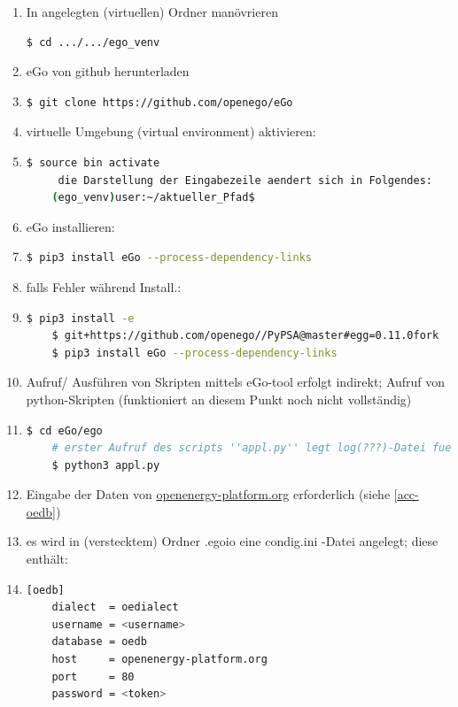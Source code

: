 \documentclass[
a4paper,     %
12pt         %
]{scrartcl}  %
\begin{document}
\begin{enumerate}
	
	\item In angelegten (virtuellen) Ordner manövrieren \begin{lstlisting}[language=bash]
	$ cd .../.../ego_venv
	\end{lstlisting}
	\item eGo von github herunterladen
	\item[] \begin{lstlisting}[language=bash]
	$ git clone https://github.com/openego/eGo
	\end{lstlisting}
	
	\item virtuelle Umgebung (virtual environment) aktivieren:
	
	\item[] \begin{lstlisting}[language=bash]
	$ source bin activate
	 die Darstellung der Eingabezeile aendert sich in Folgendes:
	(ego_venv)user:~/aktueller_Pfad$ 
	\end{lstlisting}
	
	\item eGo installieren:
	\item[] \begin{lstlisting}[language=bash]
	$ pip3 install eGo --process-dependency-links
	\end{lstlisting}
	\item[] falls Fehler während Install.:
	\item[] \begin{lstlisting}[language=bash]
	$ pip3 install -e 
	$ git+https://github.com/openego//PyPSA@master#egg=0.11.0fork
	$ pip3 install eGo --process-dependency-links
	\end{lstlisting}
	
	\item Aufruf/ Ausführen von Skripten mittels eGo-tool erfolgt indirekt; Aufruf von python-Skripten (funktioniert an diesem Punkt noch nicht vollständig)
	\item[] \begin{lstlisting}[language=bash]
	$ cd eGo/ego
	# erster Aufruf des scripts ''appl.py'' legt log(???)-Datei fuer oedb-Anmeldung an
	$ python3 appl.py
	\end{lstlisting}
	\item Eingabe der Daten von \url{openenergy-platform.org} erforderlich (siehe \ref{acc-oedb})
	\item[] es wird in (verstecktem) Ordner \glqq .egoio  \grqq eine \glqq condig.ini  \grqq -Datei angelegt; diese enthält: 
	\item[] \begin{lstlisting}[language=bash]
	[oedb]
	dialect  = oedialect
	username = <username>
	database = oedb
	host     = openenergy-platform.org
	port     = 80
	password = <token>
	\end{lstlisting}
	
	
	
\end{enumerate}
\end{document}
